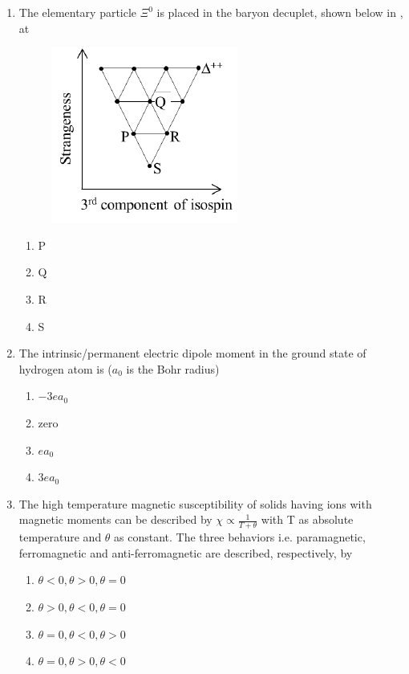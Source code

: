\documentclass[journal,12pt,onecolumn]{IEEEtran}
\theoremstyle{remark}
\begin{document}
\begin{enumerate}
    \item The elementary particle $\Xi^0$ is placed in the baryon decuplet, shown below in , at
    \begin{figure}[H]
        \centering
        \caption{} \label{fig:24} \includegraphics{figs/24.png}
    \end{figure}
    \hfill{} \begin{enumerate}
        \item P
        \item Q
        \item R
        \item S
    \end{enumerate}

    \item The intrinsic/permanent electric dipole moment in the ground state of hydrogen atom is ($a_0$ is the Bohr radius)
    \hfill{} \begin{enumerate}
        \item $-3ea_0$
        \item zero
        \item $ea_0$
        \item $3ea_0$
    \end{enumerate}

    \item The high temperature magnetic susceptibility of solids having ions with magnetic moments can be described by $\chi \propto \frac{1}{T+\theta}$ with T as absolute temperature and $\theta$ as constant. The three behaviors i.e. paramagnetic, ferromagnetic and anti-ferromagnetic are described, respectively, by
    \hfill{} \begin{enumerate}
        \item $\theta<0, \theta>0, \theta=0$
        \item $\theta>0, \theta<0, \theta=0$
        \item $\theta=0, \theta<0, \theta>0$
        \item $\theta=0, \theta>0, \theta<0$
    \end{enumerate}


\end{enumerate}
\end{document}
